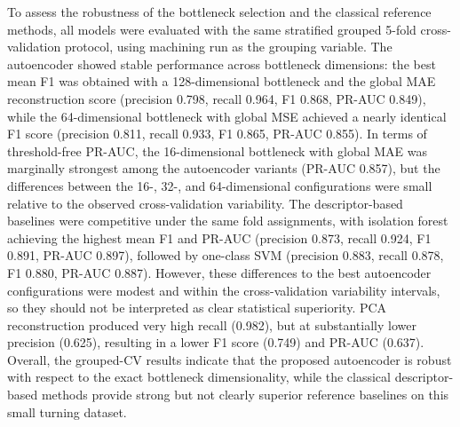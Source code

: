 To assess the robustness of the bottleneck selection and the classical reference methods, all models were evaluated with the same stratified grouped 5-fold cross-validation protocol, using machining run as the grouping variable. The autoencoder showed stable performance across bottleneck dimensions: the best mean F1 was obtained with a 128-dimensional bottleneck and the global MAE reconstruction score (precision 0.798, recall 0.964, F1 0.868, PR-AUC 0.849), while the 64-dimensional bottleneck with global MSE achieved a nearly identical F1 score (precision 0.811, recall 0.933, F1 0.865, PR-AUC 0.855). In terms of threshold-free PR-AUC, the 16-dimensional bottleneck with global MAE was marginally strongest among the autoencoder variants (PR-AUC 0.857), but the differences between the 16-, 32-, and 64-dimensional configurations were small relative to the observed cross-validation variability. The descriptor-based baselines were competitive under the same fold assignments, with isolation forest achieving the highest mean F1 and PR-AUC (precision 0.873, recall 0.924, F1 0.891, PR-AUC 0.897), followed by one-class SVM (precision 0.883, recall 0.878, F1 0.880, PR-AUC 0.887). However, these differences to the best autoencoder configurations were modest and within the cross-validation variability intervals, so they should not be interpreted as clear statistical superiority. PCA reconstruction produced very high recall (0.982), but at substantially lower precision (0.625), resulting in a lower F1 score (0.749) and PR-AUC (0.637). Overall, the grouped-CV results indicate that the proposed autoencoder is robust with respect to the exact bottleneck dimensionality, while the classical descriptor-based methods provide strong but not clearly superior reference baselines on this small turning dataset.
